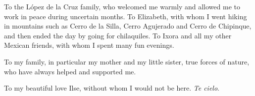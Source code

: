 {    To the L{\'o}pez de la Cruz family, who welcomed me warmly and allowed me to work in
    peace during uncertain months. To Elizabeth, with whom I went hiking in mountains such
    as Cerro de la Silla, Cerro Agujerado and Cerro de Chipinque, and then ended the day
    by going for chilaquiles. To Ixora and all my other Mexican friends, with whom I
    spent many fun evenings.

    To my family, in particular my mother and my little sister, true forces of nature, who
    have always helped and supported me.

    To my beautiful love Ilse, without whom I would not be here. \emph{Te cielo}.
}

